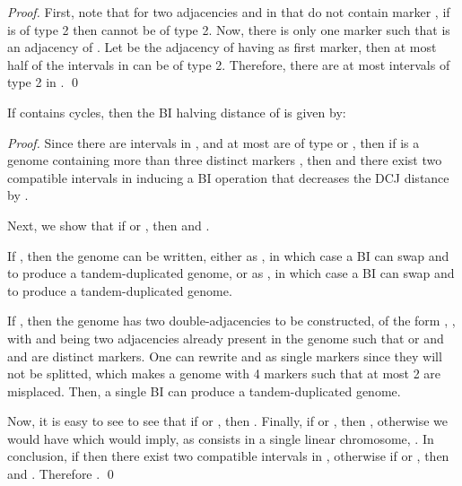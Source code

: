 \documentclass{llncs}
\begin{document}
\begin{proof}
First, note that for two adjacencies  and  in  that 
do not contain marker , if  is of type 2 then  
cannot be of type 2.
Now, there is only one marker  such that   is an adjacency 
of . Let  be the adjacency of  having  as first marker, 
then at most half of the intervals in  can 
be of type 2.
Therefore, there are at most  intervals of type 2 in .   \qed








\end{proof}


\begin{theorem}
If  contains  cycles, then the BI halving distance of 
    is given by: 

\label{th:distance}
\end{theorem}

\begin{proof}




    Since there are  intervals in , and at
    most  are of type  or , then if  is a genome
    containing more than three distinct markers , then
     and there exist two compatible intervals in
     inducing a BI operation that decreases the DCJ
    distance by .







Next, we show that if  or , then  and .
 
If , then the genome can be written, either as
, in which case a BI
can swap  and  to produce a tandem-duplicated
genome, or as , in
which case a BI can swap  and  to produce a
tandem-duplicated genome.

If , then the genome has two double-adjacencies to be
constructed, of the form , , with 
and  being two adjacencies already present in the genome
such that  or  and  and 
are distinct markers. One can rewrite  and  as
single markers since they will not be splitted, which makes a genome
with 4 markers such that at most 2 are misplaced. Then, a single BI
can produce a tandem-duplicated genome.

Now, it is easy to see to see that if   or , then . Finally, if   or , then , otherwise we would have   which would imply, as  consists in a single linear chromosome, .
In conclusion, if  then there exist two compatible intervals in  , otherwise if   or , then  and  . Therefore . \qed


\end{proof}
\end{document}
